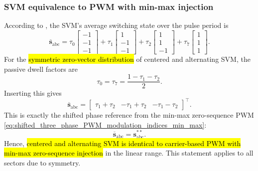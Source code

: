 \begin{frame}
    \frametitle{SVM equivalence to PWM with min-max injection}
    \small
    According to , the SVM's average switching state over the pulse period is
    \begin{equation}
        \overline{\bm{s}}_\mathrm{abc}
        =
        \tau_0 \begin{bmatrix} -1 \\ -1 \\ -1 \end{bmatrix}
        +
        \tau_1 \begin{bmatrix} 1 \\ -1 \\ -1 \end{bmatrix}
        +
        \tau_2 \begin{bmatrix} 1 \\ 1 \\ -1 \end{bmatrix}
        +
        \tau_7 \begin{bmatrix} 1 \\ 1 \\ 1 \end{bmatrix}.
    \end{equation}\pause
    For the \hl{symmetric zero-vector distribution} of centered and alternating SVM, the passive dwell factors are
    \begin{equation}
        \tau_0 = \tau_7 = \frac{1-\tau_1-\tau_2}{2}.
    \end{equation}\pause
    Inserting this gives
    \begin{equation}
        \overline{\bm{s}}_\mathrm{abc}
        =
        \begin{bmatrix}
            \tau_1+\tau_2  &
            -\tau_1+\tau_2 &
            -\tau_1-\tau_2
        \end{bmatrix}^\top.
    \end{equation}\pause
    This is exactly the shifted phase reference from the min-max zero-sequence PWM \eqref{eq:shifted_three_phase_PWM_modulation_indices_min_max}:
    \begin{equation}
        \overline{\bm{s}}_\mathrm{abc} = \bm{s}^{**}_\mathrm{abc}.
    \end{equation}
    Hence, \hl{centered and alternating SVM is identical to carrier-based PWM with min-max zero-sequence injection} in the linear range. This statement applies to all sectors due to symmetry.
\end{frame}


